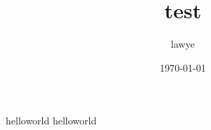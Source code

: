 \documentclass[zihao=-4,UTF8]{ctexart}
\title{test}
\author{lawye}
\date{\today}
\begin{document}
    \maketitle
    helloworld
    helloworld
\end{document}
